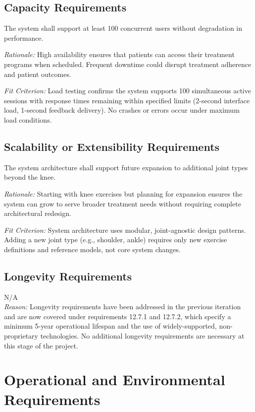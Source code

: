 \documentclass[12pt]{article}
\newcommand{\rationale}[1]{\par\emph{Rationale:} #1}
\newcommand{\fitcrit}[1]{\par\emph{Fit Criterion:} #1}
\begin{document}
\subsection{Capacity Requirements}
\begin{reqlist}
	\item[PR-CR 1.] The system shall support at least 100 concurrent users without degradation in performance.
	\rationale{High availability ensures that patients can access their treatment programs when scheduled. Frequent downtime could disrupt treatment adherence and patient outcomes.}
	\fitcrit{Load testing confirms the system supports 100 simultaneous active sessions with response times remaining within specified limits (2-second interface load, 1-second feedback delivery). No crashes or errors occur under maximum load conditions.}
\end{reqlist}

\subsection{Scalability or Extensibility Requirements}
\begin{reqlist}
	\item[PR-SER 1.] The system architecture shall support future expansion to additional joint types beyond the knee.
	\rationale{Starting with knee exercises but planning for expansion ensures the system can grow to serve broader treatment needs without requiring complete architectural redesign.}
	\fitcrit{System architecture uses modular, joint-agnostic design patterns. Adding a new joint type (e.g., shoulder, ankle) requires only new exercise definitions and reference models, not core system changes.}
\end{reqlist}

\subsection{Longevity Requirements}
\noindent N/A \\
\textit{Reason:} Longevity requirements have been addressed in the previous iteration and are now covered under requirements 12.7.1 and 12.7.2, which specify a minimum 5-year operational lifespan and the use of widely-supported, non-proprietary technologies. No additional longevity requirements are necessary at this stage of the project.

\section{Operational and Environmental Requirements}
\end{document}
